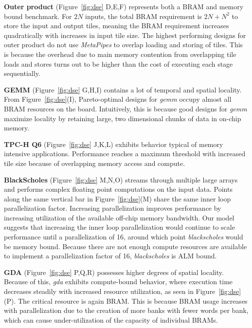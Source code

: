 \textbf{Outer product} (Figure~\ref{fig:dse} D,E,F) represents both a BRAM and memory bound benchmark. For $2N$ inputs,
the total BRAM requirement is $2N + N^2$ to store the input and output tiles, meaning the BRAM requirement
increases quadratically with increases in input tile size. The highest performing designs for outer product do not use
\emph{MetaPipes} to overlap loading and storing of tiles. This is because the overhead due to main memory contention from overlapping
tile loads and stores turns out to be higher than the cost of executing each stage sequentially.

\textbf{GEMM} (Figure~\ref{fig:dse} G,H,I) contains a lot of temporal and spatial locality. From Figure~\ref{fig:dse}(I), Pareto-optimal designs for \emph{gemm}
occupy almost all BRAM resources on the board. Intuitively, this is  because good designs for \emph{gemm}
maximize locality by retaining large, two dimensional chunks of data in on-chip memory.

\textbf{TPC-H Q6} (Figure~\ref{fig:dse} J,K,L) exhibits behavior typical of memory intensive applications. Performance reaches a maximum threshold
with increased tile size because of overlapping memory access and compute.

\textbf{BlackScholes} (Figure~\ref{fig:dse} M,N,O) streams through multiple large arrays and performs complex floating point computations
on the input data. Points along the same vertical bar in Figure~\ref{fig:dse}(M) share the same inner loop parallelization
factor. Increasing parallelization improves performance by increasing utilization of the available off-chip memory bandwidth.
Our model suggests that increasing the inner loop parallelization would continue to scale
performance until a parallelization of 16, around which point \emph{blackscholes} would be memory bound. Because there are not enough compute resources are available to implement a parallelization factor of 16, \emph{blackscholes} is ALM bound.

\textbf{GDA} (Figure~\ref{fig:dse} P,Q,R) possesses higher degrees of spatial locality. Because of this, \emph{gda} exhibits compute-bound behavior, where execution time
decreases steadily with increased resource utilization, as seen in Figure~\ref{fig:dse}(P). The critical resource is again BRAM. This is because BRAM usage increases with parallelization due to the creation of
more banks with fewer words per bank, which can cause under-utilization of the capacity of individual BRAMs.

